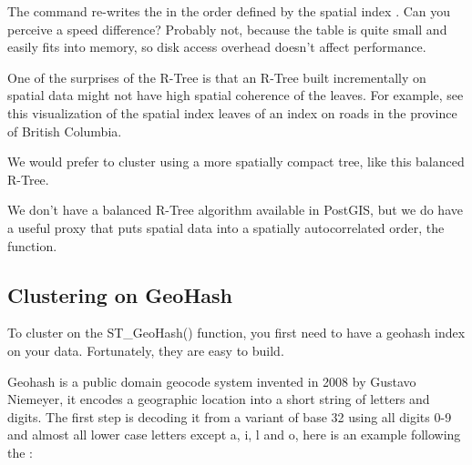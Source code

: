 \documentclass[a4paper,11pt,english]{sphinxmanual}
\begin{document}
The command re-writes the  in the order defined by the spatial index . Can you perceive a speed difference? Probably not, because the table is quite small and easily fits into memory, so disk access overhead doesn’t affect performance.

One of the surprises of the R-Tree is that an R-Tree built incrementally on spatial data might not have high spatial coherence of the leaves. For example, see this visualization of the spatial index leaves of an index on roads in the province of British Columbia.

\noindent{}

We would prefer to cluster using a more spatially compact tree, like this balanced R-Tree.

\noindent{}

We don’t have a balanced R-Tree algorithm available in PostGIS, but we do have a useful proxy that puts spatial data into a spatially autocorrelated order, the  function.


\subsection{Clustering on GeoHash}
\label{\detokenize{advanced:clustering-on-geohash}}
To cluster on the ST\_GeoHash() function, you first need to have a geohash index on your data. Fortunately, they are easy to build.

Geohash is a public domain geocode system invented in 2008 by Gustavo Niemeyer, it encodes a geographic location into a short string of letters and digits. The first step is decoding it from a variant of base 32 using all digits 0-9 and almost all lower case letters except a, i, l and o, here is an example following the :
\end{document}
